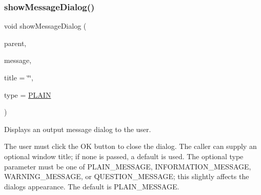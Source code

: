 \subsubsection{\texorpdfstring{show\+Message\+Dialog()}{showMessageDialog()}\hspace{0.1cm}{\footnotesize\ttfamily [2/3]}}
{\footnotesize\ttfamily void show\+Message\+Dialog (\begin{DoxyParamCaption}\item[{\mbox{\hyperlink{classGWindow}{G\+Window}} $\ast$}]{parent,  }\item[{const std\+::string \&}]{message,  }\item[{const std\+::string \&}]{title = {\ttfamily \char`\"{}\char`\"{}},  }\item[{\mbox{\hyperlink{classGOptionPane_ac6606ebe91c8ac66a2c314c79f5ab013}{Message\+Type}}}]{type = {\ttfamily \mbox{\hyperlink{classGOptionPane_ac6606ebe91c8ac66a2c314c79f5ab013a8386f3e3e7be0b7b603636867c133a5d}{P\+L\+A\+IN}}} }\end{DoxyParamCaption})\hspace{0.3cm}{\ttfamily [static]}}



Displays an output message dialog to the user. 

The user must click the \textquotesingle{}OK\textquotesingle{} button to close the dialog. The caller can supply an optional window title; if none is passed, a default is used. The optional \textquotesingle{}type\textquotesingle{} parameter must be one of P\+L\+A\+I\+N\+\_\+\+M\+E\+S\+S\+A\+GE, I\+N\+F\+O\+R\+M\+A\+T\+I\+O\+N\+\_\+\+M\+E\+S\+S\+A\+GE, W\+A\+R\+N\+I\+N\+G\+\_\+\+M\+E\+S\+S\+A\+GE, or Q\+U\+E\+S\+T\+I\+O\+N\+\_\+\+M\+E\+S\+S\+A\+GE; this slightly affects the dialog\textquotesingle{}s appearance. The default is P\+L\+A\+I\+N\+\_\+\+M\+E\+S\+S\+A\+GE. \mbox{\label{classGOptionPane_a98590e47196bf04738c2b97e9b7f6d0b}} 
